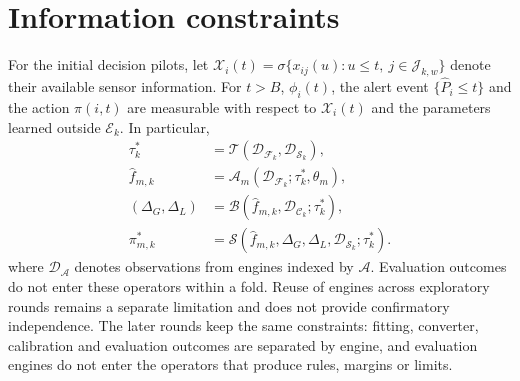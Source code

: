 \documentclass[12pt]{article}
\begin{document}
\section{Information constraints}\label{app:information}

For the initial decision pilots, let $\mathcal X_i(t)=\sigma\{x_{ij}(u):u\leq t,\ j\in\mathcal J_{k,w}\}$ denote their available sensor information. For $t>B$, $\phi_i(t)$, the alert event $\{\widehat P_i\leq t\}$ and the action $\pi(i,t)$ are measurable with respect to $\mathcal X_i(t)$ and the parameters learned outside $\mathcal E_k$. In particular,
\[
\begin{aligned}
\tau_k^*&=\mathcal T(\mathcal D_{\mathcal F_k},\mathcal D_{\mathcal S_k}),\\
\widehat f_{m,k}&=\mathcal A_m(\mathcal D_{\mathcal F_k};\tau_k^*,\theta_m),\\
(\Delta_G,\Delta_L)&=\mathcal B(\widehat f_{m,k},\mathcal D_{\mathcal C_k};\tau_k^*),\\
\pi_{m,k}^*&=\mathcal S(\widehat f_{m,k},\Delta_G,\Delta_L,\mathcal D_{\mathcal S_k};\tau_k^*).
\end{aligned}
\]
where $\mathcal D_{\mathcal A}$ denotes observations from engines indexed by $\mathcal A$. Evaluation outcomes do not enter these operators within a fold. Reuse of engines across exploratory rounds remains a separate limitation and does not provide confirmatory independence. The later rounds keep the same constraints: fitting, converter, calibration and evaluation outcomes are separated by engine, and evaluation engines do not enter the operators that produce rules, margins or limits.
\end{document}

